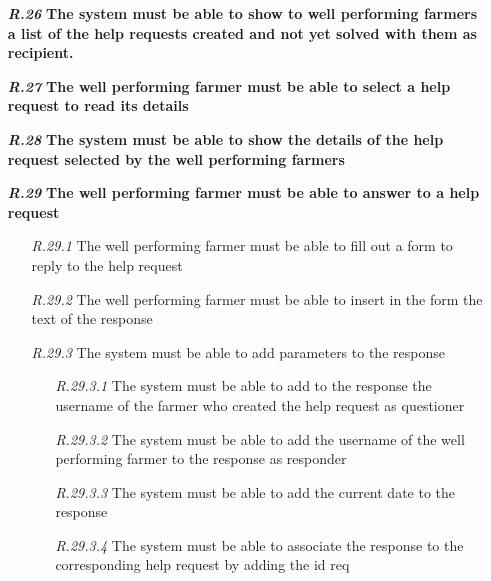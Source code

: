 \begin{itemize}
\item [\textbf{\textit{R.26}}] \textbf{The system must be able to show to well performing farmers a list of the help requests created and not yet solved with them as recipient.}
\item [\textbf{\textit{R.27}}] \textbf{The well performing farmer must be able to select a help request to read its details}
\item [\textbf{\textit{R.28}}] \textbf{The system must be able to show the details of the help request selected by the well performing farmers}
\item [\textbf{\textit{R.29}}] \textbf{The well performing farmer must be able to answer to a help request}
        \begin{itemize}
            \item [\textit{R.29.1}] The well performing farmer must be able to fill out a form to reply to the help request
            \item [\textit{R.29.2}] The well performing farmer must be able to insert in the form the text of the response
            \item [\textit{R.29.3}] The system must be able to add parameters to the response
            \begin{itemize}
                \item [\textit{R.29.3.1}] The system must be able to add to the response the username of the farmer who created the help request as questioner
                \item [\textit{R.29.3.2}] The system must be able to add the username of the well performing farmer to the response as responder
		        \item [\textit{R.29.3.3}] The system must be
		        able to add the current date to the response
		        \item [\textit{R.29.3.4}] The system must be able to associate the response to the corresponding help request by adding the id req
            \end{itemize}
        \end{itemize}



\end{itemize}
